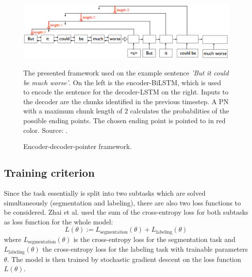 \documentclass[twoside,11pt,a4paper]{article}
\theoremstyle{break}
\begin{document}
\begin{figure}
	\begin{center}
		\includegraphics[width = 15cm]{model3.png}
		\caption{Encoder-decoder-pointer framework.}
		The presented framework used on the example sentence \textit{'But it could be much worse'}. On the left is the encoder-BiLSTM, which is used to encode the sentence for the decoder-LSTM on the right. Inputs to the decoder are the chunks identified in the previous timestep. A PN with a maximum chunk length of $2$ calculates the probabilities of the possible ending points. The chosen ending point is pointed to in red color. Source: \cite{zhai:2017}.
		\label{fig:model3}
	\end{center}
\end{figure}

\subsection{Training criterion}
Since the task essentially is split into two subtasks which are solved simultaneously (segmentation and labeling), there are also two loss functions to be considered. Zhai et al. used the sum of the cross-entropy loss for both subtasks as loss function for the whole model:
\[
	L(\theta) := L_{\text{segmentation}}(\theta) + L_{\text{labeling}}(\theta)
\]
where $L_{\text{segmentation}}(\theta)$ is the cross-entropy loss for the segmentation task and $L_{\text{labeling}}(\theta)$ the cross-entropy loss for the labeling task with trainable parameters $\theta$. The model is then trained by stochastic gradient descent on the loss function $L(\theta)$.
\end{document}
